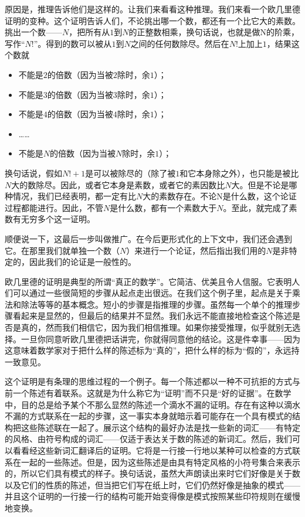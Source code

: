 原因是，推理告诉他们是这样的。让我们来看看这种推理。我们来看一个欧几里德证明的变种。这个证明告诉人们，不论挑出哪一个数，都还有一个比它大的素数。挑出一个数——$N$，把所有从$1$到$N$的正整数相乘，换句话说，也就是做N的阶乘，写作“$N!$”。得到的数可以被从$1$到$N$之间的任何数除尽。然后在$N!$上加上$1$，结果这个数就
\begin{itemize}
\item 不能是$2$的倍数（因为当被$2$除时，余$1$）；
\item 不能是$3$的倍数（因为当被$3$除时，余$1$）；
\item 不能是$4$的倍数（因为当被$4$除时，余$1$）；
\item ……
\item 不能是$N$的倍数（因为当被$N$除时，余$1$）；
\end{itemize}
换句话说，假如$N!+1$是可以被除尽的（除了被$1$和它本身除之外），也只能是被比$N$大的数除尽。因此，或者它本身是素数，或者它的素因数比$N$大。但是不论是哪种情况，我们已经表明，都一定有比$N$大的素数存在。不论N是什么数，这个论证过程都能进行。因此，不管$N$是什么数，都有一个素数大于$N$。至此，就完成了素数有无穷多个这一证明。

顺便说一下，这最后一步叫做推广。在今后更形式化的上下文中，我们还会遇到它。在那里我们就单独一个数（$N$）来进行一个论证，然后指出我们用的$N$是非特定的，因此我们的论证是一般性的。

欧几里德的证明是典型的所谓“真正的数学”。它简洁、优美且令人信服。它表明人们可以通过一些很简短的步骤从起点走出很远。在我们这个例子里，起点是关于乘法和除法等等的基本概念。短小的步骤是指推理的步骤。虽然每一个单个的推理步骤看起来是显然的，但最后的结果并不显然。我们永远不能直接地检查这个陈述是否是真的，然而我们相信它，因为我们相信推理。如果你接受推理，似乎就别无选择。一旦你同意听欧几里德把话讲完，你就得同意他的结论。这是件幸事——因为这意味着数学家对于把什么样的陈述标为“真的”，把什么样的标为“假的”，永远持一致意见。

这个证明是有条理的思维过程的一个例子。每一个陈述都以一种不可抗拒的方式与前一个陈述有着联系。这就是为什么称它为“证明”而不只是“好的证据”。在数学中，目的总是给予某个不那么显然的陈述一个滴水不漏的证明。存在有这种以滴水不漏的方式联系在一起的步骤，这一事实本身就暗示着可能存在一个具有模式的结构把这些陈述联在一起了。展示这个结构的最好办法是找一些新的词汇——有特定的风格、由符号构成的词汇——仅适于表达关于数的陈述的新词汇。然后，我们可以看看经这些新词汇翻译后的证明。它将是一行接一行地以某种可以检查的方式联系在一起的一些陈述。但是，因为这些陈述是由具有特定风格的小符号集合来表示的，所以它们具有模式的样子。换句话说，虽然大声朗读出来时它们好像是关于数以及它们的性质的陈述，但当把它们写在纸上时，它们仍然好像是抽象的模式——并且这个证明的一行接一行的结构可能开始变得像是模式按照某些印符规则在缓慢地变换。

